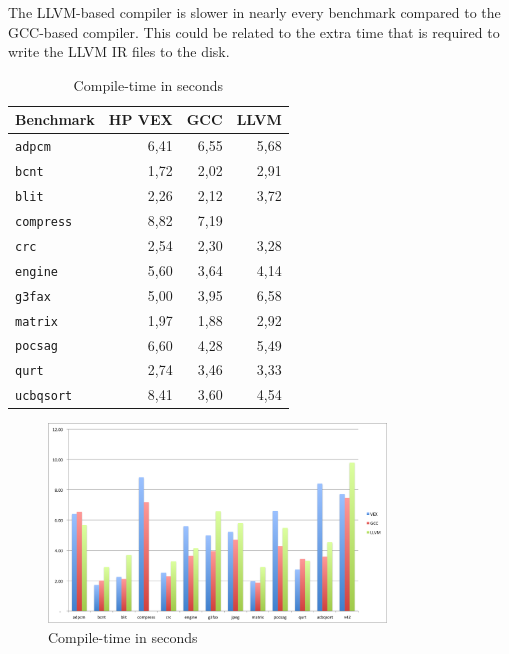 The LLVM-based compiler is slower in nearly every benchmark compared to the GCC-based compiler. This could be related to the extra time that is required to write the LLVM IR files to the disk. %

\begin{table}
  \centering
    \begin{tabular}{|l|r|r|r|}
    \hline
    \textbf{Benchmark} & \multicolumn{1}{|r|}{\textbf{HP VEX}} & \multicolumn{1}{|r|}{\textbf{GCC}}  & \multicolumn{1}{|r|}{\textbf{LLVM}} \\ \hline
	\texttt{adpcm} 		& 6,41 & 6,55 & 5,68 \\ \hline
	\texttt{bcnt} 		& 1,72 & 2,02 & 2,91 \\ \hline
	\texttt{blit} 		& 2,26 & 2,12 & 3,72 \\ \hline
	\texttt{compress} 	& 8,82 & 7,19 & \\ \hline
	\texttt{crc} 		& 2,54 & 2,30 & 3,28 \\ \hline
	\texttt{engine} 	& 5,60 & 3,64 & 4,14 \\ \hline
	\texttt{g3fax} 		& 5,00 & 3,95 & 6,58 \\ \hline
	\texttt{matrix} 	& 1,97 & 1,88 & 2,92 \\ \hline
	\texttt{pocsag} 	& 6,60 & 4,28 & 5,49 \\ \hline
	\texttt{qurt}	 	& 2,74 & 3,46 & 3,33 \\ \hline
	\texttt{ucbqsort} 	& 8,41 & 3,60 & 4,54 \\ \hline
    \end{tabular}
  \caption{Compile-time in seconds}
  \label{tbl:compile-time}
\end{table}

\begin{figure}[ht]
\centering
\includegraphics[width=0.8\textwidth]{5_results/img/compile-time.png}
\caption{Compile-time in seconds}
\label{fig:compile-time}
\end{figure}

